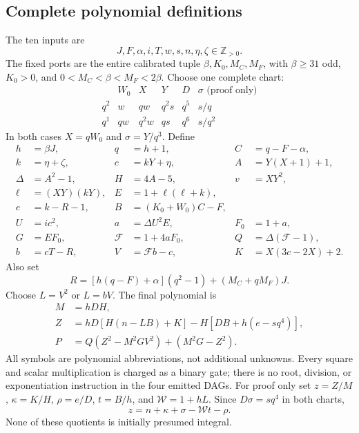 \subsection{Complete polynomial definitions}
The ten inputs are
\[
 J,F,\alpha,i,T,w,s,n,\eta,\zeta\in\mathbb Z_{>0}.
\]
The fixed ports are the entire calibrated tuple $\beta,K_0,M_C,M_F$, with
$\beta\ge31$ odd, $K_0>0$, and $0<M_C<\beta<M_F<2\beta$.
Choose one complete chart:
\[
\begin{array}{c|ccccc}
 &W_0&X&Y&D&\sigma\text{ (proof only)}\\\hline
q^2&w&qw&q^2s&q^5&s/q\\
q^1&qw&q^2w&qs&q^6&s/q^2
\end{array}
\]
In both cases $X=qW_0$ and $\sigma=Y/q^3$. Define
\begin{align*}
 h&=\beta J,&q&=h+1,&C&=q-F-\alpha,\\
 k&=\eta+\zeta,&c&=kY+\eta,&A&=Y(X+1)+1,\\
 \Delta&=A^2-1,&H&=4A-5,&v&=XY^2,\\
 \ell&=(XY)(kY),&E&=1+\ell(\ell+k),\\
 e&=k-R-1,&B&=(K_0+W_0)C-F,\\
 U&=ic^2,&a&=\Delta U^2E,&F_0&=1+a,\\
 G&=EF_0,&\mathcal F&=1+4aF_0,&Q&=\Delta(\mathcal F-1),\\
 b&=cT-R,&V&=\mathcal F b-c,&K&=X(3c-2X)+2.
\end{align*}
Also set\[R=[h(q-F)+\alpha](q^2-1)+(M_C+qM_F)J.\]
Choose $L=V^2$ or $L=bV$. The final polynomial is
\begin{align}
 M&=hDH,\nonumber\\
 Z&=hD[H(n-LB)+K]-H[DB+h(e-sq^4)],\label{eq:r19carrier}\\
 P&=Q(Z^2-M^2GV^2)+(M^2G-Z^2).\label{eq:r19poly}
\end{align}
All symbols are polynomial abbreviations, not additional unknowns. Every
square and scalar multiplication is charged as a binary gate; there is no
root, division, or exponentiation instruction in the four emitted DAGs.
For proof only set $z=Z/M$, $\kappa=K/H$, $\rho=e/D$, $t=B/h$, and
$\mathcal W=1+hL$. Since $D\sigma=sq^4$ in both charts,
\begin{equation}
 z=n+\kappa+\sigma-\mathcal Wt-\rho.
 \label{eq:r19rational}
\end{equation}
None of these quotients is initially presumed integral.

